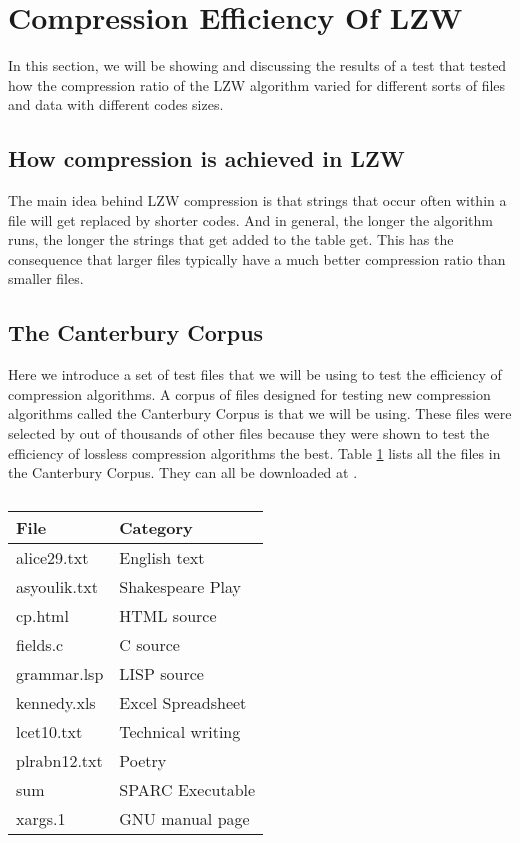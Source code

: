 \section{Compression Efficiency Of LZW}

In this section, we will be showing and discussing the results of a
test that tested how the compression ratio of the LZW algorithm varied
for different sorts of files and data with different codes sizes.

\subsection{How compression is achieved in LZW}

The main idea behind LZW compression is that strings that occur often
within a file will get replaced by shorter codes. And in general, the
longer the algorithm runs, the longer the strings that get added to
the table get. This has the consequence that larger files typically
have a much better compression ratio than smaller files.

\subsection{The Canterbury Corpus}

Here we introduce a set of test files that we will be using to test
the efficiency of compression algorithms. A corpus of files designed
for testing new compression algorithms called the Canterbury Corpus is
that we will be using. These files were selected by
\cite{arnold:corpus} out of thousands of other files because they were
shown to test the efficiency of lossless compression algorithms the
best. Table \ref{tab:corp-files} lists all the files in the Canterbury
Corpus. They can all be downloaded at \cite{powell:desc-corp}.

\begin{table}
  \centering
  \begin{tabular}{ll}
    \toprule
    File & Category \\
    \midrule
    alice29.txt & English text \\
    asyoulik.txt & Shakespeare Play \\
    cp.html & HTML source \\
    fields.c & C source \\
    grammar.lsp & LISP source \\
    kennedy.xls & Excel Spreadsheet \\
    lcet10.txt & Technical writing \\
    plrabn12.txt & Poetry \\
    sum & SPARC Executable \\
    xargs.1 & GNU manual page \\
    \bottomrule

  \end{tabular}
  \caption{}
  \label{tab:corp-files}
\end{table}

